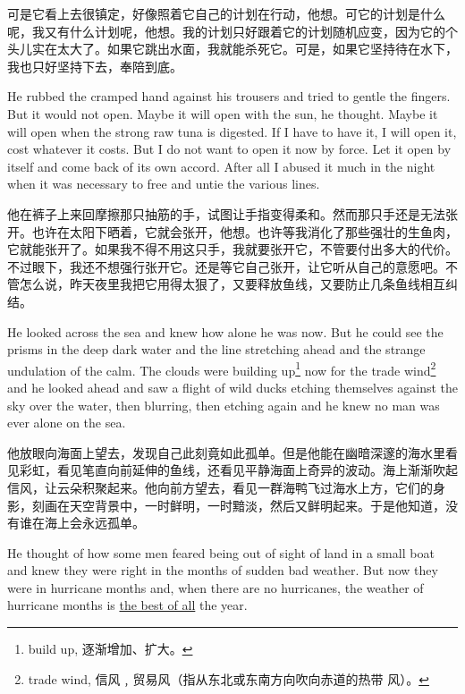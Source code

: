 \begin{paracol}{2}
\switchcolumn

可是它看上去很镇定，好像照着它自己的计划在行动，他想。可它的计划是什么呢，我又有什么计划呢，他想。我的计划只好跟着它的计划随机应变，因为它的个头儿实在太大了。如果它跳出水面，我就能杀死它。可是，如果它坚持待在水下，我也只好坚持下去，奉陪到底。

\switchcolumn*

He \gls{rubbed} the cramped hand against his trousers and tried to gentle the
fingers. But it would not open. Maybe it will open with the sun, he thought.
Maybe it will open when the strong raw tuna is \gls{digested}. If I have to
have it, I will open it, cost whatever it costs. But I do not want to open
it now by force. Let it open by itself and come back of its own
\gls{accord}. After all I \gls{abused} it much in the night when it was
necessary to free and \gls{untie} the \gls{various} lines.

\switchcolumn

他在裤子上来回摩擦那只抽筋的手，试图让手指变得柔和。然而那只手还是无法张开。也许在太阳下晒着，它就会张开，他想。也许等我消化了那些强壮的生鱼肉，它就能张开了。如果我不得不用这只手，我就要张开它，不管要付出多大的代价。不过眼下，我还不想强行张开它。还是等它自己张开，让它听从自己的意愿吧。不管怎么说，昨天夜里我把它用得太狠了，又要释放鱼线，又要防止几条鱼线相互纠结。

\switchcolumn*

He looked across the sea and knew how alone he was now. But he could see the
prisms in the deep dark water and the line \gls{stretching} ahead and the
strange \gls{undulation} of the calm. The clouds were building
up\footnote{build up, 逐渐增加、扩大。} now for the trade
wind\footnote{trade wind, 信风﹐贸易风（指从东北或东南方向吹向赤道的热带
  风）。} and he looked ahead and saw a \gls{flight} of wild ducks \gls{etching}
themselves against the sky over the water, then \gls{blurring}, then etching again
and he knew no man was ever alone on the sea.

\switchcolumn

他放眼向海面上望去，发现自己此刻竟如此孤单。但是他能在幽暗深邃的海水里看见彩虹，看见笔直向前延伸的鱼线，还看见平静海面上奇异的波动。海上渐渐吹起信风，让云朵积聚起来。他向前方望去，看见一群海鸭飞过海水上方，它们的身影，刻画在天空背景中，一时鲜明，一时黯淡，然后又鲜明起来。于是他知道，没有谁在海上会永远孤单。

\switchcolumn*

He thought of how some men \gls{feared} being out of sight of land in a
small boat and knew they were right in the months of sudden bad weather. But
now they were in \gls{hurricane} months and, when there are no hurricanes, the
weather of hurricane months is \uline{the best of all} the year.


\end{paracol}
